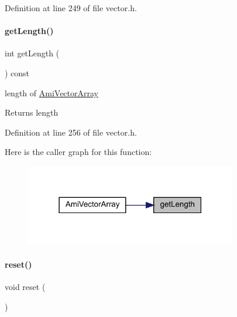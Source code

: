 Definition at line 249 of file vector.\+h.

\mbox{\label{classamici_1_1_ami_vector_array_a5f00d4dc3e7866d193ce926f35542801}} 
\paragraph{\texorpdfstring{getLength()}{getLength()}}
{\footnotesize\ttfamily int get\+Length (\begin{DoxyParamCaption}{ }\end{DoxyParamCaption}) const}

length of \mbox{\hyperlink{classamici_1_1_ami_vector_array}{Ami\+Vector\+Array}} \begin{DoxyReturn}{Returns}
length 
\end{DoxyReturn}


Definition at line 256 of file vector.\+h.

Here is the caller graph for this function\+:
\nopagebreak
\begin{figure}[H]
\begin{center}
\leavevmode
\includegraphics[width=262pt]{classamici_1_1_ami_vector_array_a5f00d4dc3e7866d193ce926f35542801_icgraph}
\end{center}
\end{figure}
\mbox{\label{classamici_1_1_ami_vector_array_ad20897c5c8bd47f5d4005989bead0e55}} 
\paragraph{\texorpdfstring{reset()}{reset()}}
{\footnotesize\ttfamily void reset (\begin{DoxyParamCaption}{ }\end{DoxyParamCaption})}

